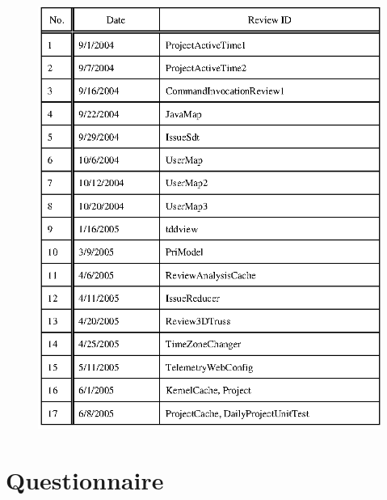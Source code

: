 \begin{figure}[htbp]
  \centering
  \includegraphics{images/appndx-3.eps}
  \label{appndx-3}
\end{figure}

\chapter{Questionnaire}
\label{appndx:questionnaire}

